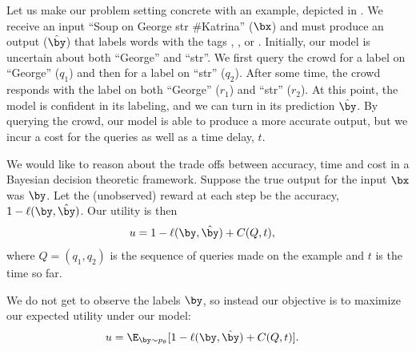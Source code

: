 Let us make our problem setting concrete with an example, depicted in .
We receive an input ``Soup on George str \#Katrina'' ($\bx$) and must produce an output ($\byt$) that labels words with the tags \scper{}, \scloc{}, \scres{} or \scnone{}.
Initially, our model is uncertain about both ``George'' and ``str''.
We first query the crowd for a label on ``George'' ($q_1$) and then for a label on ``str'' ($q_2$). 
After some time, the crowd responds with the label \scloc{} on both ``George'' ($r_1$) and ``str'' ($r_2$).
At this point, the model is confident in its labeling, and we can turn in its prediction $\byt$.
By querying the crowd, our model is able to produce a more accurate output, but we incur a cost for the queries as well as a time delay, $t$.

We would like to reason about the trade offs between accuracy, time and cost in a Bayesian decision theoretic framework.
Suppose the true output for the input $\bx$ was $\by$.
Let the (unobserved) reward at each step be the accuracy, $1 - \ell(\by, \byt)$.
Our utility is then 
\begin{align*}
u &= 1 - \ell(\by, \byt) + C(Q, t),
\end{align*}
where $Q = (q_1, q_2)$ is the sequence of queries made on the example and $t$ is the time so far.

We do not get to observe the labels $\by$, so instead our objective is to maximize our expected utility under our model:
\begin{align*}
  u &= \E_{\by \sim \p}[1 - \ell(\by, \byt) + C(Q, t)].
\end{align*}

%
%
%
